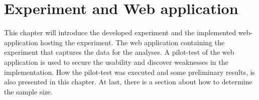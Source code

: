 \chapter{Experiment and Web application}
This chapter will introduce the developed experiment and the implemented web-application hosting the experiment. The web application containing the experiment that captures the data for the analyses. A pilot-test of the web application is used to secure the usability and discover weaknesses in the implementation. How the pilot-test was executed and some preliminary results, is also presented in this chapter. At last, there is a section about how to determine the sample size.  


